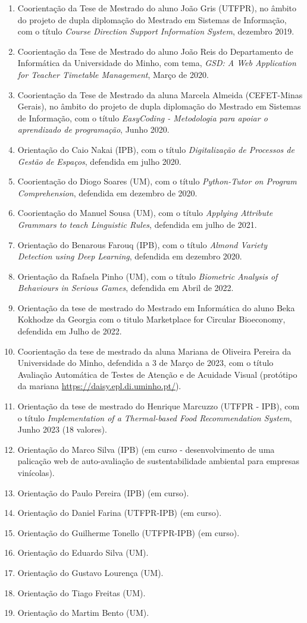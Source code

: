 \documentclass[11pt]{article}
\begin{document}
\begin{enumerate}
\item {Coorientação da Tese de Mestrado do aluno João Gris (UTFPR), no âmbito do projeto de dupla diplomação do Mestrado em Sistemas de Informação, com o título {\em{ Course Direction Support Information System}}, dezembro 2019.}
\item {Coorientação da Tese de Mestrado do aluno João Reis do Departamento de Informática da Universidade do Minho, com tema, {\em{ GSD: A Web Application for Teacher Timetable Management}}, Março de 2020.}
\item {Coorientação da Tese de Mestrado da aluna Marcela Almeida (CEFET-Minas Gerais), no âmbito do projeto de dupla diplomação do Mestrado em Sistemas de Informação, com o título {\em{ EasyCoding - Metodologia para apoiar o aprendizado de programação}}, Junho 2020.}
\item {Orientação do Caio Nakai (IPB), com o título {\em{ Digitalização de Processos de Gestão de Espaços}}, defendida em julho 2020.}
\item {Coorientação do Diogo Soares (UM), com o título {\em{ Python-Tutor on Program Comprehension}}, defendida em dezembro de 2020.}
\item {Coorientação do Manuel Sousa (UM), com o título {\em{ Applying Attribute Grammars to teach Linguistic Rules}}, defendida em julho de 2021.}
\item {Orientação do Benarous Farouq (IPB), com o título {\em{ Almond Variety Detection using Deep Learning}}, defendida em dezembro 2020.}
\item {Orientação da Rafaela Pinho (UM), com o título {\em{ Biometric Analysis of Behaviours in Serious Games}}, defendida em Abril de 2022.}
\item {Orientação da tese de mestrado do Mestrado em Informática do aluno Beka Kokhodze da Georgia com o titulo Marketplace for Circular Bioeconomy, defendida em Julho de 2022.}
\item {Coorientação da tese de mestrado da aluna Mariana de Oliveira Pereira  da Universidade do Minho, defendida a 3 de Março de 2023, com o título Avaliação Automática de Testes de Atenção e de Acuidade Visual (protótipo da mariana \url{https://daisy.epl.di.uminho.pt/}).}
\item {Orientação da tese de mestrado do Henrique Marcuzzo (UTFPR - IPB), com o título {\em{ Implementation of a Thermal-based Food Recommendation System}}, Junho 2023 (18 valores). }
\item {Orientação do Marco Silva (IPB) (em curso - desenvolvimento de uma palicação web de auto-avaliação de sustentabilidade ambiental para empresas vinícolas).}
\item {Orientação do Paulo Pereira (IPB) (em curso).}
\item {Orientação do Daniel Farina (UTFPR-IPB) (em curso).}
\item {Orientação do Guilherme Tonello (UTFPR-IPB) (em curso).}
\item {Orientação do Eduardo Silva (UM).}
\item {Orientação do Gustavo Lourença (UM).}
\item {Orientação do Tiago Freitas (UM).}
\item {Orientação do Martim Bento (UM).}



\end{enumerate}
\end{document}
